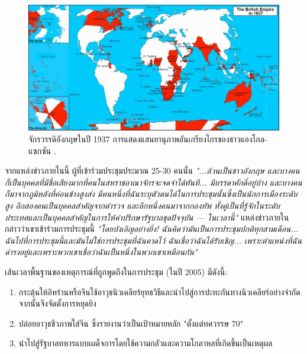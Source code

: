 \documentclass[10pt,twocolumn,letterpaper]{article}
\begin{document}
\begin{figure}[t]
\begin{center}
\includegraphics[width=1\textwidth]{british.jpg}
\end{center}
   \caption{จักรวรรดิอังกฤษในปี 1937 การแสดงแสนยานุภาพอันเกรียงไกรของชาวแองโกล-แซกซัน \cite{14}.}
   \label{fig:2}
\end{figure}
จากแหล่งข่าวภายในนี้ ผู้ที่เข้าร่วมประชุมประมาณ 25-30 คนนั้น \textit{"...ล้วนเป็นชาวอังกฤษ และบางคนก็เป็นบุคคลที่มีชื่อเสียงมากที่คนในสหราชอาณาจักรจะจดจำได้ทันที... มีบรรดาศักดิ์อยู่บ้าง และบางคนก็มาจากภูมิหลังที่ค่อนข้างสูงส่ง มีคนหนึ่งที่ฉันระบุตัวตนได้ในการประชุมนั้นซึ่งเป็นนักการเมืองระดับสูง อีกสองคนเป็นบุคคลสำคัญจากตำรวจ และอีกหนึ่งคนมาจากกองทัพ ทั้งคู่เป็นที่รู้จักในระดับประเทศและเป็นบุคคลสำคัญในการให้คำปรึกษารัฐบาลชุดปัจจุบัน — ในเวลานี้"} \cite{4} แหล่งข่าวภายในกล่าวว่าเขาเข้าร่วมการประชุมนี้ \textit{"โดยบังเอิญอย่างยิ่ง! ฉันคิดว่ามันเป็นการประชุมปกติทุกสามเดือน... ฉันไปที่การประชุมนี้และมันไม่ใช่การประชุมที่ฉันคาดไว้ ฉันเชื่อว่าฉันได้รับเชิญ... เพราะตำแหน่งที่ฉันดำรงอยู่และเพราะพวกเขาเชื่อว่าฉันเป็นหนึ่งในพวกเขาเหมือนกัน"} \cite{4}

เส้นเวลาพื้นฐานของเหตุการณ์ที่ถูกพูดถึงในการประชุม (ในปี 2005) มีดังนี้:

\begin{flushleft}
\begin{enumerate}
    \item กระตุ้นให้อิหร่านหรือจีนใช้อาวุธนิวเคลียร์ยุทธวิธีและนำไปสู่การปะทะกันทางนิวเคลียร์อย่างจำกัด จากนั้นจึงจัดตั้งการหยุดยิง
    \item ปล่อยอาวุธชีวภาพใส่จีน ซึ่งรายงานว่าเป็นเป้าหมายหลัก "ตั้งแต่ทศวรรษ 70"
    \item นำไปสู่รัฐบาลทหารแบบเผด็จการโดยใช้ความกลัวและความโกลาหลที่เกิดขึ้นเป็นเหตุผล
\end{enumerate}
\end{flushleft}
\end{document}
